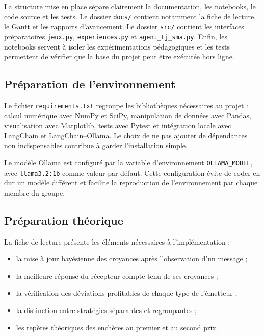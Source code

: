 \documentclass[11pt,a4paper]{article}
\begin{document}
La structure mise en place sépare clairement la documentation, les notebooks,
le code source et les tests. Le dossier \texttt{docs/} contient notamment la
fiche de lecture, le Gantt et les rapports d'avancement. Le dossier
\texttt{src/} contient les interfaces préparatoires \texttt{jeux.py},
\texttt{experiences.py} et \texttt{agent\_tj\_sma.py}. Enfin, les notebooks
servent à isoler les expérimentations pédagogiques et les tests permettent
de vérifier que la base du projet peut être exécutée hors ligne.

\subsection{Préparation de l'environnement}

Le fichier \texttt{requirements.txt} regroupe les bibliothèques nécessaires
au projet : calcul numérique avec NumPy et SciPy, manipulation de données avec
Pandas, visualisation avec Matplotlib, tests avec Pytest et intégration locale
avec LangChain et LangChain--Ollama. Le choix de ne pas ajouter de dépendances
non indispensables contribue à garder l'installation simple.

Le modèle Ollama est configuré par la variable d'environnement
\texttt{OLLAMA\_MODEL}, avec \texttt{llama3.2:1b} comme valeur par défaut.
Cette configuration évite de coder en dur un modèle différent et facilite la
reproduction de l'environnement par chaque membre du groupe.

\subsection{Préparation théorique}

La fiche de lecture présente les éléments nécessaires à l'implémentation :

\begin{itemize}
    \item la mise à jour bayésienne des croyances après l'observation d'un
    message ;
    \item la meilleure réponse du récepteur compte tenu de ses croyances ;
    \item la vérification des déviations profitables de chaque type de
    l'émetteur ;
    \item la distinction entre stratégies séparantes et regroupantes ;
    \item les repères théoriques des enchères au premier et au second prix.
\end{itemize}
\end{document}
